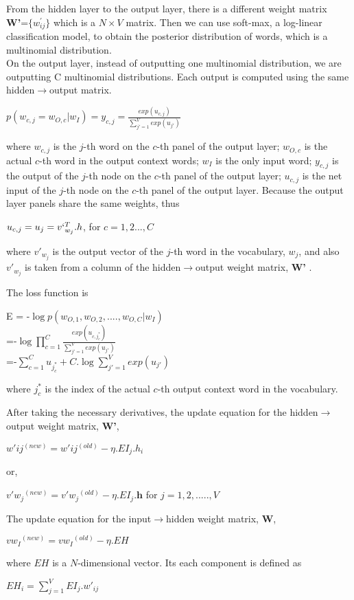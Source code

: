 From the hidden layer to the output layer, there is a different weight matrix \textbf{W'}=$\{w_{ij}^{'}\}$ which is a $N \times V$ matrix. Then we can use soft-max, a log-linear classification model, to obtain the posterior distribution of words, which is a multinomial distribution.\\
On the output layer, instead of outputting one multinomial distribution, we are outputting C multinomial distributions. Each output is computed using the same hidden$\rightarrow$output matrix.
\begin{center}
$p(w_{c,j}=w_{O,c}|w_I)=y_{c,j}=\frac{exp(u_{c,j})}{\sum_{j'=1}^{V}exp(u_{j'})}$
\end{center}
where $w_{c,j}$ is the $j$-th word on the $c$-th panel of the output layer; $w_{O,c}$ is the actual $c$-th word in the output context words; $w_I$ is the only input word; $y_{c,j}$ is the output of the $j$-th node on the $c$-th panel of the output layer; $u_{c,j}$ is the net input of the $j$-th node on the $c$-th panel of the output layer.
Because the output layer panels share the same weights, thus
\begin{center}
$u_{c,j}=u_j=v`_{w_j}^T.h$, for $c=1,2...,C$
\end{center}
where $v'_{w_j}$ is the output vector of the $j$-th word in the vocabulary, $w_j$, and also $v'_{w_j}$ is taken from a column of the hidden$\rightarrow$output weight matrix, \textbf{W'} .

The loss function is
\begin{center}
E = -$\log p(w_{O,1},w_{O,2},....,w_{O,C}|w_I)$\\
=-$\log \prod_{c=1}^{C}\frac{exp(u_{c,j_{c}^{*	}})}{\sum_{j'=1}^{V}exp(u_{j'})}$\\
=-$\sum_{c=1}^{C} u_{j_{c}^{*}}+C.\log \sum_{j'=1}^{V}exp(u_{j'})$
\end{center}
where $j_{c}^{*}$ is the index of the actual $c$-th output context word in the vocabulary.

After taking the necessary derivatives, the update equation for the hidden$\rightarrow$output weight matrix, \textbf{W'},
\begin{center}
$w'{ij}^{(new)}=w'{ij}^{(old)}-\eta .EI_j.h_i$
\end{center}
or,
\begin{center}
$v'{w_j}^{(new)}=v'{w_j}^{(old)}-\eta .EI_j.\textbf{h}$ for $j=1,2,.....,V$
\end{center}

The update equation for the input$\rightarrow$hidden weight matrix, \textbf{W},
\begin{center}
$v{w_I}^{(new)}=v{w_I}^{(old)}-\eta .EH$
\end{center}
where $EH$ is a $N$-dimensional vector. Its each component is defined as
\begin{center}
$EH_i=\sum_{j=1}^{V}EI_j.w'_{ij}$
\end{center}

